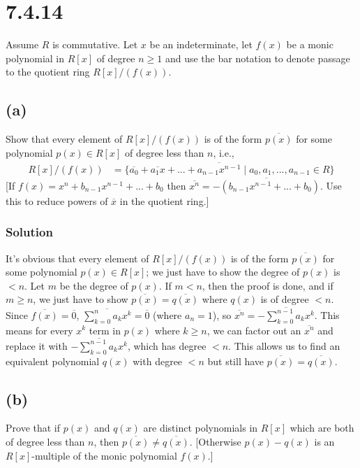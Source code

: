 \documentclass[fleqn]{article}
\begin{document}
    \section{7.4.14}
    Assume $R$ is commutative.  Let $x$ be an indeterminate, let $f(x)$ be a monic polynomial in $R[x]$ of degree $n \geq 1$ and use the bar notation to denote passage to the quotient ring $R[x]/(f(x))$.
        
        \subsection{(a)}
        Show that every element of $R[x]/(f(x))$ is of the form $\overline{p(x)}$ for some polynomial $p(x) \in R[x]$ of degree less than $n$, i.e., 
        \begin{align}
            R[x]/(f(x)) &= \{\overline{a_0} + \overline{a_1 x} + ... + \overline{a_{n - 1} x^{n - 1}} \mid a_0, a_1, ..., a_{n - 1} \in R\}
        \end{align}
        [If $f(x) = x^n + b_{n - 1} x^{n - 1} + ... + b_0$ then $\overline{x^n} = \overline{-(b_{n - 1} x^{n - 1} + ... + b_0)}$.  Use this to reduce powers of $\overline{x}$ in the quotient ring.]
            
            \subsubsection{Solution}
            It's obvious that every element of $R[x]/(f(x))$ is of the form $\overline{p(x)}$ for some polynomial $p(x) \in R[x]$; we just have to show the degree of $p(x)$ is $< n$.  Let $m$ be the degree of $p(x)$. If $m < n$, then the proof is done, and if $m \geq n$, we just have to show $\overline{p(x)} = \overline{q(x)}$ where $q(x)$ is of degree $< n$.  Since $\overline{f(x)} = \overline{0}$, $\overline{\sum\limits_{k = 0}^{n} a_k x^k} = \overline{0}$ (where $a_n = 1$), so $\overline{x^n} = \overline{-\sum\limits_{k = 0}^{n - 1} a_k x^k}$.  This means for every $x^k$ term in $p(x)$ where $k \geq n$, we can factor out an $\overline{x^n}$ and replace it with $\overline{-\sum\limits_{k = 0}^{n - 1} a_k x^k}$, which has degree $< n$.  This allows us to find an equivalent polynomial $q(x)$ with degree $< n$ but still have $\overline{p(x)} = \overline{q(x)}$.
        
        \subsection{(b)}
        Prove that if $p(x)$ and $q(x)$ are distinct polynomials in $R[x]$ which are both of degree less than $n$, then $\overline{p(x)} \neq \overline{q(x)}$.  [Otherwise $p(x) - q(x)$ is an $R[x]$-multiple of the monic polynomial $f(x)$.]
            
\end{document}
